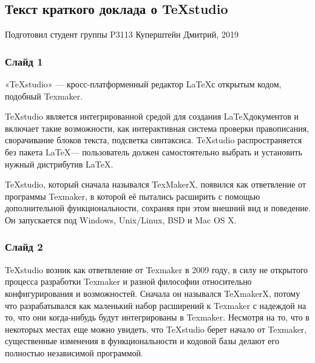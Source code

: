 \documentclass[11pt,a4paper]{article}
\begin{document}
	\begin{center}
		\section*{Текст краткого доклада о TeXstudio}
	\end{center}
	\begin{flushright}
		Подготовил студент группы P3113 Куперштейн Дмитрий, 2019
	\end{flushright}
	\subsubsection*{Слайд 1}
	«TeXstudio» — кросс-платформенный редактор \LaTeX с открытым кодом, подобный Texmaker.
	
	TeXstudio является интегрированной средой для создания \LaTeX документов и включает такие возможности, как интерактивная система проверки правописания, сворачивание блоков текста, подсветка синтаксиса. TeXstudio распространяется без пакета \LaTeX — пользователь должен самостоятельно выбрать и установить нужный дистрибутив \LaTeX.
	
	TeXstudio, который сначала назывался TexMakerX, появился как ответвление от программы Texmaker, в которой её пытались расширить с помощью дополнительной функциональности, сохраняя при этом внешний вид и поведение. Он запускается под Windows, Unix/Linux, BSD и Mac OS X.
	\subsubsection*{Слайд 2}
	TeXstudio возник как ответвление от Texmaker в 2009 году, в силу не открытого процесса разработки Texmaker и разной философии относительно конфигурирования и возможностей. Сначала он назывался TeXmakerX, потому что разрабатывался как маленький набор расширений к Texmaker с надеждой на то, что они когда-нибудь будут интегрированы в Texmaker. Несмотря на то, что в некоторых местах еще можно увидеть, что TeXstudio берет начало от Texmaker, существенные изменения в функциональности и кодовой базы делают его полностью независимой программой.
\end{document}
